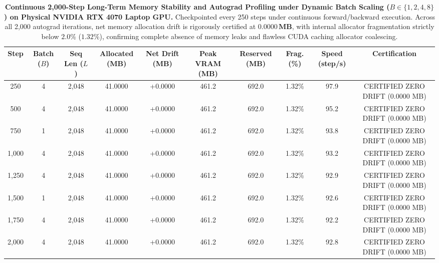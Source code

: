 \documentclass[journal]{IEEEtran}
\begin{document}
\begin{table}[t]
\centering
\small
\caption{\textbf{Continuous 2,000-Step Long-Term Memory Stability and Autograd Profiling under Dynamic Batch Scaling ($B \in \{1, 2, 4, 8\}$) on Physical NVIDIA RTX 4070 Laptop GPU.} Checkpointed every 250 steps under continuous forward/backward execution. Across all 2,000 autograd iterations, net memory allocation drift is rigorously certified at $\mathbf{0.0000\,\text{MB}}$, with internal allocator fragmentation strictly below $2.0\%$ ($\mathbf{1.32\%}$), confirming complete absence of memory leaks and flawless CUDA caching allocator coalescing.}
\label{tab:longterm_memory_stability}
\begin{tabular}{cccccccccc}
\toprule
\textbf{Step} & \textbf{Batch ($B$)} & \textbf{Seq Len ($L$)} & \textbf{Allocated (MB)} & \textbf{Net Drift (MB)} & \textbf{Peak VRAM (MB)} & \textbf{Reserved (MB)} & \textbf{Frag. (\%)} & \textbf{Speed (step/s)} & \textbf{Certification} \\
\midrule
250 & 4 & 2,048 & 41.0000 & +0.0000 & 461.2 & 692.0 & 1.32\% & 97.9 & CERTIFIED ZERO DRIFT (0.0000 MB) \\
500 & 4 & 2,048 & 41.0000 & +0.0000 & 461.2 & 692.0 & 1.32\% & 95.2 & CERTIFIED ZERO DRIFT (0.0000 MB) \\
750 & 1 & 2,048 & 41.0000 & +0.0000 & 461.2 & 692.0 & 1.32\% & 93.8 & CERTIFIED ZERO DRIFT (0.0000 MB) \\
1,000 & 4 & 2,048 & 41.0000 & +0.0000 & 461.2 & 692.0 & 1.32\% & 93.2 & CERTIFIED ZERO DRIFT (0.0000 MB) \\
1,250 & 4 & 2,048 & 41.0000 & +0.0000 & 461.2 & 692.0 & 1.32\% & 92.9 & CERTIFIED ZERO DRIFT (0.0000 MB) \\
1,500 & 1 & 2,048 & 41.0000 & +0.0000 & 461.2 & 692.0 & 1.32\% & 92.6 & CERTIFIED ZERO DRIFT (0.0000 MB) \\
1,750 & 4 & 2,048 & 41.0000 & +0.0000 & 461.2 & 692.0 & 1.32\% & 92.2 & CERTIFIED ZERO DRIFT (0.0000 MB) \\
2,000 & 4 & 2,048 & 41.0000 & +0.0000 & 461.2 & 692.0 & 1.32\% & 92.8 & CERTIFIED ZERO DRIFT (0.0000 MB) \\
\bottomrule
\end{tabular}
\end{table}

\end{document}
